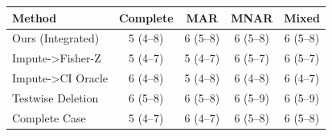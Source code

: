 \begin{tabular}{lcccc}
\toprule
Method & Complete & MAR & MNAR & Mixed \\
\midrule
Ours (Integrated) & 5 (4--8) & 6 (5--8) & 6 (5--8) & 6 (5--8) \\
Impute->Fisher-Z & 5 (4--7) & 5 (4--7) & 6 (5--7) & 6 (5--7) \\
Impute->CI Oracle & 6 (4--8) & 5 (4--8) & 6 (4--8) & 6 (4--7) \\
Testwise Deletion & 6 (5--8) & 6 (5--8) & 6 (5--9) & 6 (5--9) \\
Complete Case & 5 (4--7) & 6 (4--7) & 6 (5--8) & 6 (5--8) \\
\bottomrule
\end{tabular}